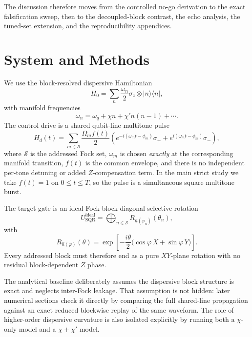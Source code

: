 \documentclass[aps,pra,twocolumn,reprint,floatfix,amsmath,amssymb]{revtex4-2}
\begin{document}
The discussion therefore moves from the controlled no-go derivation to the exact falsification sweep, then to the decoupled-block contrast, the echo analysis, the tuned-set extension, and the reproducibility appendices.

\section{System and Methods}
\label{sec:model}

We use the block-resolved dispersive Hamiltonian
\begin{equation}
H_0 = \sum_{n} \frac{\omega_n}{2}\sigma_z \otimes |n\rangle\langle n|,
\end{equation}
with manifold frequencies
\begin{equation}
\omega_n = \omega_q + \chi n + \chi' n(n-1) + \cdots .
\end{equation}
The control drive is a shared qubit-line multitone pulse
\begin{equation}
H_d(t) = \sum_{m \in \mathcal{S}} \frac{\Omega_m f(t)}{2}
\left(
e^{-i(\omega_m t-\phi_m)}\sigma_+
+ e^{i(\omega_m t-\phi_m)}\sigma_-
\right),
\label{eq:drive}
\end{equation}
where \(\mathcal{S}\) is the addressed Fock set, \(\omega_m\) is chosen \emph{exactly} at the corresponding manifold transition, \(f(t)\) is the common envelope, and there is no independent per-tone detuning or added \(Z\)-compensation term. In the main strict study we take \(f(t)=1\) on \(0 \le t \le T\), so the pulse is a simultaneous square multitone burst.

The target gate is an ideal Fock-block-diagonal selective rotation
\begin{equation}
U_{\mathrm{SQR}}^{\mathrm{ideal}}
= \bigoplus_{n \in \mathcal{S}} R_{\hat n(\varphi_n)}(\theta_n),
\end{equation}
with
\begin{equation}
R_{\hat n(\varphi)}(\theta)
= \exp\!\left[
-\frac{i\theta}{2}\bigl(\cos\varphi\,X+\sin\varphi\,Y\bigr)
\right].
\end{equation}
Every addressed block must therefore end as a pure \(XY\)-plane rotation with no residual block-dependent \(Z\) phase.

The analytical baseline deliberately assumes the dispersive block structure is exact and neglects inter-Fock leakage. That assumption is not hidden: later numerical sections check it directly by comparing the full shared-line propagation against an exact reduced blockwise replay of the same waveform. The role of higher-order dispersive curvature is also isolated explicitly by running both a \(\chi\)-only model and a \(\chi+\chi'\) model.
\end{document}
